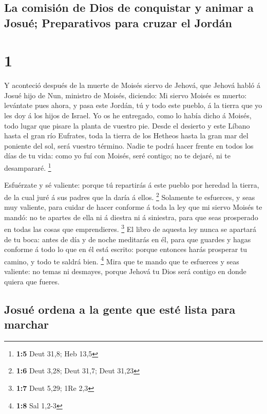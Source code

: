 \hypertarget{la-comisiuxf3n-de-dios-de-conquistar-y-animar-a-josuuxe9-preparativos-para-cruzar-el-jorduxe1n}{%
\subsection{La comisión de Dios de conquistar y animar a Josué;
Preparativos para cruzar el
Jordán}\label{la-comisiuxf3n-de-dios-de-conquistar-y-animar-a-josuuxe9-preparativos-para-cruzar-el-jorduxe1n}}

\hypertarget{section}{%
\section{1}\label{section}}

 Y aconteció después de la muerte de Moisés siervo de
Jehová, que Jehová habló á Josué hijo de Nun, ministro de Moisés,
diciendo:  Mi siervo Moisés es muerto: levántate pues ahora,
y pasa este Jordán, tú y todo este pueblo, á la tierra que yo les doy á
los hijos de Israel.  Yo os he entregado, como lo había
dicho á Moisés, todo lugar que pisare la planta de vuestro pie.
 Desde el desierto y este Líbano hasta el gran río Eufrates,
toda la tierra de los Hetheos hasta la gran mar del poniente del sol,
será vuestro término.  Nadie te podrá hacer frente en todos
los días de tu vida: como yo fuí con Moisés, seré contigo; no te dejaré,
ni te desampararé. \footnote{\textbf{1:5} Deut 31,8; Heb 13,5}

 Esfuérzate y sé valiente: porque tú repartirás á este
pueblo por heredad la tierra, de la cual juré á sus padres que la daría
á ellos. \footnote{\textbf{1:6} Deut 3,28; Deut 31,7; Deut 31,23}
 Solamente te esfuerces, y seas muy valiente, para cuidar de
hacer conforme á toda la ley que mi siervo Moisés te mandó: no te
apartes de ella ni á diestra ni á siniestra, para que seas prosperado en
todas las cosas que emprendieres. \footnote{\textbf{1:7} Deut 5,29; 1Re
  2,3}  El libro de aquesta ley nunca se apartará de tu
boca: antes de día y de noche meditarás en él, para que guardes y hagas
conforme á todo lo que en él está escrito: porque entonces harás
prosperar tu camino, y todo te saldrá bien. \footnote{\textbf{1:8} Sal
  1,2-3}  Mira que te mando que te esfuerces y seas
valiente: no temas ni desmayes, porque Jehová tu Dios será contigo en
donde quiera que fueres.

\hypertarget{josuuxe9-ordena-a-la-gente-que-estuxe9-lista-para-marchar}{%
\subsection{Josué ordena a la gente que esté lista para
marchar}\label{josuuxe9-ordena-a-la-gente-que-estuxe9-lista-para-marchar}}

